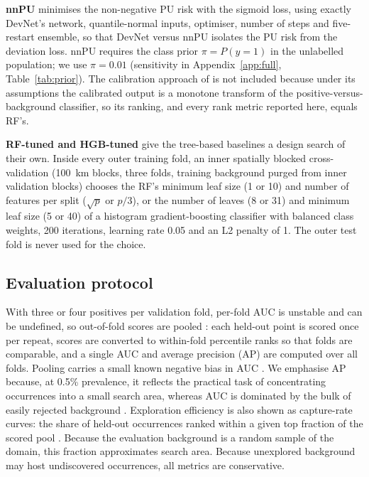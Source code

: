 \documentclass[pdflatex,sn-apa]{sn-jnl}
\begin{document}
\textbf{nnPU} \citep{Kiryo2017} minimises the non-negative PU risk with the sigmoid loss, using exactly DevNet's network, quantile-normal inputs, optimiser, number of steps and five-restart ensemble, so that DevNet versus nnPU isolates the PU risk from the deviation loss. nnPU requires the class prior $\pi = P(y=1)$ in the unlabelled population; we use $\pi = 0.01$ (sensitivity in Appendix~\ref{app:full}, Table~\ref{tab:prior}). The calibration approach of \citet{Elkan2008} is not included because under its assumptions the calibrated output is a monotone transform of the positive-versus-background classifier, so its ranking, and every rank metric reported here, equals RF's.

\textbf{RF-tuned and HGB-tuned} give the tree-based baselines a design search of their own. Inside every outer training fold, an inner spatially blocked cross-validation (100~km blocks, three folds, training background purged from inner validation blocks) chooses the RF's minimum leaf size (1 or 10) and number of features per split ($\sqrt{p}$ or $p/3$), or the number of leaves (8 or 31) and minimum leaf size (5 or 40) of a histogram gradient-boosting classifier \citep{Pedregosa2011} with balanced class weights, 200 iterations, learning rate 0.05 and an L2 penalty of 1. The outer test fold is never used for the choice.

\subsection{Evaluation protocol}\label{sec:protocol}

With three or four positives per validation fold, per-fold AUC is unstable and can be undefined, so out-of-fold scores are pooled \citep{BradleyAP1997}: each held-out point is scored once per repeat, scores are converted to within-fold percentile ranks so that folds are comparable, and a single AUC and average precision (AP) are computed over all folds. Pooling carries a small known negative bias in AUC \citep{Airola2019,Parker2007}. We emphasise AP because, at 0.5\% prevalence, it reflects the practical task of concentrating occurrences into a small search area, whereas AUC is dominated by the bulk of easily rejected background \citep{Saito2015}. Exploration efficiency is also shown as capture-rate curves: the share of held-out occurrences ranked within a given top fraction of the scored pool \citep{Chung2003,Agterberg2005}. Because the evaluation background is a random sample of the domain, this fraction approximates search area. Because unexplored background may host undiscovered occurrences, all metrics are conservative.
\end{document}
